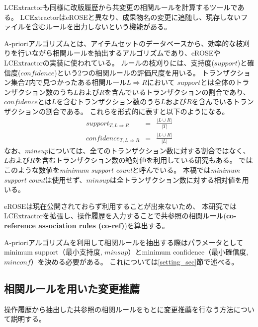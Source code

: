 \documentclass[a4paper]{jsbook}
\def\Ra{\Rightarrow}
\newcommand{\minconf}{mincon\!f}
\newcommand{\confidence}{con\!f\!idence}
\begin{document}
LCExtractor\cite{Hagward:2015,Mori:2015}も同様に改版履歴から共変更の相関ルールを計算するツールである。
LCExtractorはeROSEと異なり、成果物名の変更に追随し、現存しないファイルを含むルールを出力しないという機能がある。

A-prioriアルゴリズム\cite{Bondugula:2006}とは、アイテムセットのデータベースから、効率的な枝刈りを行いながら相関ルールを抽出するアルゴリズムであり、eROSEやLCExtractorの実装に使われている。
ルールの枝刈りには、支持度($support$)と確信度($\confidence$)という2つの相関ルールの評価尺度を用いる。
トランザクション集合$T$内で見つかったある相関ルール$L \Ra R$において
$support$とは全体のトランザクション数のうち$L$および$R$を含んでいるトランザクションの割合であり、
$\confidence$とは$L$を含むトランザクション数のうち$L$および$R$を含んでいるトランザクションの割合である。
これらを形式的に表すと以下のようになる。
\begin{eqnarray}
  support_{T,L \Ra R} &=& \frac{| L \cup R |}{|T|} \label{support_eqn}\\
  \confidence_{T,L \Ra R} &=& \frac{| L \cup R |}{|L|}\label{confidence_eqn}
\end{eqnarray}
なお、$minsup$については、全てのトランザクション数に対する割合ではなく、$L$および$R$を含むトランザクション数の絶対値を利用している研究もある。
\cite{Zimmermann:2005}ではこのような数値を{\it minimum support count}と呼んでいる。
本稿では{\it minimum support count}は使用せず、$minsup$は全トランザクション数に対する相対値を用いる。

eROSEは現在公開されておらず利用することが出来ないため、
本研究ではLCExtractorを拡張し、操作履歴を入力することで共参照の相関ルール({\bf co-reference association rules (co-ref)})を算出する。

A-prioriアルゴリズムを利用して相関ルールを抽出する際はパラメータとしてminimum support（最小支持度, $minsup$）とminimum confidence（最小確信度, $\minconf$）を決める必要がある。
これについては\ref{setting_sec}節で述べる。


\subsection{相関ルールを用いた変更推薦}\label{ranking_sec}
操作履歴から抽出した共参照の相関ルールをもとに変更推薦を行なう方法について説明する。
\end{document}
